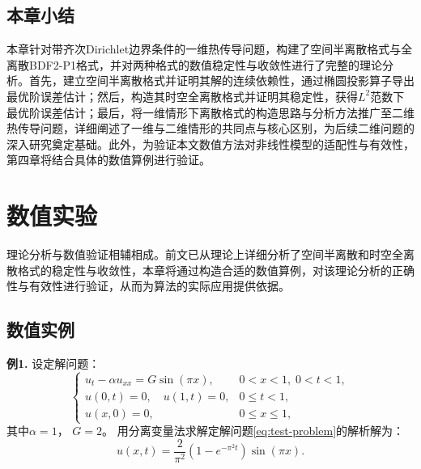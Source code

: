 \documentclass{GZUbachelorthesis}
\theoremstyle{chineseplain}
\begin{document}
\subsection{本章小结}
本章针对带齐次Dirichlet边界条件的一维热传导问题，构建了空间半离散格式与全离散BDF2-P1格式，并对两种格式的数值稳定性与收敛性进行了完整的理论分析。首先，建立空间半离散格式并证明其解的连续依赖性，通过椭圆投影算子导出最优阶误差估计；然后，构造其时空全离散格式并证明其稳定性，获得$L^2$范数下最优阶误差估计；最后，将一维情形下离散格式的构造思路与分析方法推广至二维热传导问题，详细阐述了一维与二维情形的共同点与核心区别，为后续二维问题的深入研究奠定基础。此外，为验证本文数值方法对非线性模型的适配性与有效性，第四章将结合具体的数值算例进行验证。
\newpage
\section{数值实验}
理论分析与数值验证相辅相成。前文已从理论上详细分析了空间半离散和时空全离散格式的稳定性与收敛性，本章将通过构造合适的数值算例，对该理论分析的正确性与有效性进行验证，从而为算法的实际应用提供依据。
\subsection{数值实例}
\textbf{例1.} 设定解问题：
\begin{equation}
	\begin{cases}
		u_t -\alpha u_{xx} = G \sin\left(\pi x\right), & 0 < x < 1,\; 0 < t <1, \\
		u(0,t) = 0, \quad u(1,t) = 0, & 0 \leq t < 1, \\
		u(x,0) = 0, & 0 \leq x \leq 1,
	\end{cases}
	\label{eq:test-problem}
\end{equation}
其中$\alpha = 1$， $G = 2$。
用分离变量法求解定解问题\eqref{eq:test-problem}的解析解为：
\begin{equation}
	u(x,t) = \frac{2}{\pi^2} \left(1 - e^{-\pi^2 t}\right) \sin(\pi x).
\end{equation}
\end{document}
